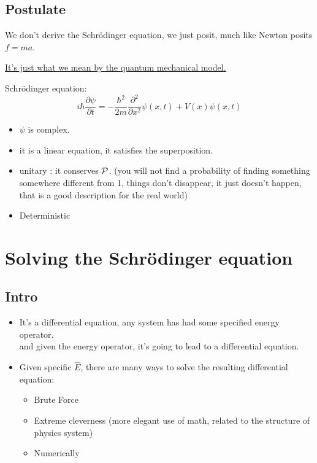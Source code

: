 \documentclass[12pt,oneside]{book}
\begin{document}
\section{Postulate }
We don't derive the Schrödinger equation, we just posit, much like Newton posits $f=ma$.
\begin{center}
	\underline{It's just what we mean by the quantum mechanical model.}
\end{center}
Schrödinger equation:
\[i\hbar \frac{\partial \psi}{\partial t} = - \frac{\hbar^2}{2m}\frac{\partial^2}{\partial x^2}\psi(x,t) + V(x)\psi(x,t)\]
\begin{itemize}
	\item $\psi$ is complex.
	\item it is a linear equation, it satisfies the superposition.
	\item unitary : it conserves $\mathcal{P}$. (you will not find a probability of finding something somewhere different from 1, things don't disappear, it just doesn't happen, that is a good description for the real world)
	\item Deterministic
\end{itemize}
\chapter{Solving the Schrödinger equation}
\section{Intro}
\begin{itemize}
	\item It's a differential equation, any system has had some specified energy operator.\\
	      and given the energy operator, it's going to lead to a differential equation.
	\item Given specific $\hat{E}$, there are many ways to solve the resulting differential equation:
	      \begin{itemize}
		      \item Brute Force
		      \item Extreme cleverness (more elegant use of math, related to the structure of physics system)
		      \item Numerically
	      \end{itemize}
\end{itemize}
\end{document}
